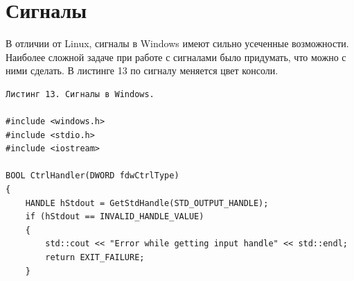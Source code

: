 \documentclass[a4paper,12pt]{article} %
\begin{document}
\newpage
\section*{Сигналы}

В отличии от Linux, сигналы в Windows имеют сильно усеченные возможности. Наиболее сложной задаче при работе с сигналами было придумать, что можно с ними сделать. В листинге 13 по сигналу меняется цвет консоли.

\begin{verbatim}
Листинг 13. Сигналы в Windows.

#include <windows.h>
#include <stdio.h>
#include <iostream>

BOOL CtrlHandler(DWORD fdwCtrlType)
{
    HANDLE hStdout = GetStdHandle(STD_OUTPUT_HANDLE);
    if (hStdout == INVALID_HANDLE_VALUE)
    {
        std::cout << "Error while getting input handle" << std::endl;
        return EXIT_FAILURE;
    }


\end{verbatim}
\end{document}
